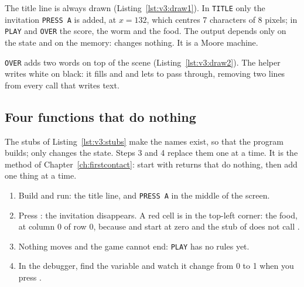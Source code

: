 The title line is always drawn (Listing~\ref{lst:v3:draw1}). In
\texttt{TITLE} only the invitation \texttt{PRESS A} is added, at $x=132$,
which centres 7 characters of 8 pixels; in \texttt{PLAY} and \texttt{OVER}
the score, the worm and the food. The output depends only on the state and on
the memory:  changes nothing. It is a Moore machine.


\texttt{OVER} adds two words on top of the scene
(Listing~\ref{lst:v3:draw2}). The helper  writes white on
black: it fills  and  and lets  to  pass
through, removing two lines from every call that writes text.

\subsection{Four functions that do nothing}


The stubs of Listing~\ref{lst:v3:stubs} make the names exist, so that the
program builds;  only changes the state. Steps 3 and 4
replace them one at a time. It is the method of
Chapter~\ref{ch:firstcontact}: start with returns that do nothing, then add
one thing at a time.

\begin{prgcheck}
\begin{enumerate}[nosep]
\item Build and run: the title line, and \texttt{PRESS A} in the middle of the
  screen.
\item Press : the invitation disappears. A red cell is in the top-left
  corner: the food, at column 0 of row 0, because  and
   start at zero and the stub of  does not call
  .
\item Nothing moves and the game cannot end: \texttt{PLAY} has no rules yet.
\item In the debugger, find the variable  and watch it change from
  0 to 1 when you press .
\end{enumerate}
\end{prgcheck}

